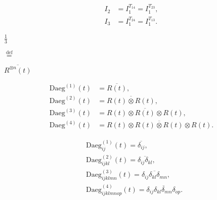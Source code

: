 \documentclass[a4paper,11pt,twoside,openright]{book}
\def\lthtmlcheckvsize{\ifdim\ht\sizebox<\vsize 
  \ifdim\wd\sizebox<\hsize\expandafter\hfill\fi \expandafter\vfill
  \else\expandafter\vss\fi}%
\begin{document}
{\newpage\clearpage
\setcounter{equation}{18}
%
\begin{subequations}\begin{align}
I_2 &= I_1^{T_{14}} = I_1^{T_{23}} , \\
I_3 &= I_1^{T_{24}} = I_1^{T_{13}} .
\end{align}\end{subequations}%
\lthtmldisplayZ
\lthtmlcheckvsize\clearpage}

{\newpage\clearpage
{}%
$\displaystyle {\tfrac{{1}}{{3}}}$%
\lthtmlindisplaymathZ
\lthtmlcheckvsize\clearpage}

{\newpage\clearpage
{}%
$\displaystyle \overset{\mathrm{def}}{=}$%
\lthtmlindisplaymathZ
\lthtmlcheckvsize\clearpage}

{\newpage\clearpage
{}%
$\displaystyle \overline{{R^{\otimes n}(t)}}$%
\lthtmlindisplaymathZ
\lthtmlcheckvsize\clearpage}

{\newpage\clearpage
\setcounter{equation}{23}
%
\begin{subequations}\begin{align}
\textrm{Daeg}^{(1)}(t) &= \overline{R(t)} , \\
\textrm{Daeg}^{(2)}(t) &= \overline{R(t) \otimes R(t)} , \\
\textrm{Daeg}^{(3)}(t) &= \overline{R(t) \otimes R(t) \otimes R(t)} , \\
\textrm{Daeg}^{(4)}(t) &= \overline{R(t) \otimes R(t) \otimes R(t) \otimes R(t)} .
\end{align}\end{subequations}%
\lthtmldisplayZ
\lthtmlcheckvsize\clearpage}

{\newpage\clearpage
\setcounter{equation}{24}
%
\begin{subequations}\begin{align}
&\textrm{Daeg}^{(1)}_{ij}(t) = \overline{\delta_{ij}} , \\
&\textrm{Daeg}^{(2)}_{ijkl}(t) = \overline{\delta_{ij}\delta_{kl}} , \\
&\textrm{Daeg}^{(3)}_{ijklmn}(t) = \overline{\delta_{ij}\delta_{kl}\delta_{mn}} , \\
&\textrm{Daeg}^{(4)}_{ijklmnop}(t) = \overline{\delta_{ij}\delta_{kl}\delta_{mn}\delta_{op}} .
\end{align}\end{subequations}%
\lthtmldisplayZ
\lthtmlcheckvsize\clearpage}
\end{document}
